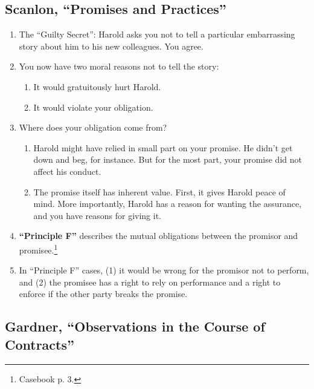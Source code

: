 \subsection{Scanlon, ``Promises and Practices''}

\begin{enumerate}
    \item The ``Guilty Secret'': Harold asks you not to tell a particular 
    embarrassing story about him to his new colleagues. You agree.
    \item You now have two moral reasons not to tell the story:
    \begin{enumerate}
        \item It would gratuitously hurt Harold.
        \item It would violate your obligation.
    \end{enumerate}
    \item Where does your obligation come from?
    \begin{enumerate}
        \item Harold might have relied in small part on your promise. He 
        didn't get down and beg, for instance. But for the most part, your 
        promise did not affect his conduct.
        \item The promise itself has inherent value. First, it gives Harold 
        peace of mind. More importantly, Harold has a reason for wanting the 
        assurance, and you have reasons for giving it.
    \end{enumerate}
    \item \textbf{``Principle F''} describes the mutual obligations between 
    the promisor and promisee.\footnote{Casebook p. 3.}
    \item In ``Principle F'' cases, (1) it would be wrong for the promisor not 
    to perform, and (2) the promisee has a right to rely on performance and a 
    right to enforce if the other party breaks the promise.
\end{enumerate}

\subsection{Gardner, ``Observations in the Course of Contracts''}

